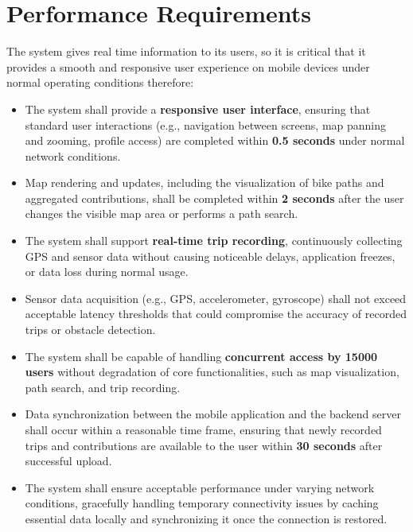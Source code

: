\section{Performance Requirements}

The system gives real time information to its users, so it is critical that it provides a smooth and responsive user experience on mobile devices under normal operating conditions therefore:

\begin{itemize}
    \item The system shall provide a \textbf{responsive user interface}, ensuring that standard user interactions (e.g., navigation between screens, map panning and zooming, profile access) are completed within \textbf{0.5 seconds} under normal network conditions.
    
    \item Map rendering and updates, including the visualization of bike paths and aggregated contributions, shall be completed within \textbf{2 seconds} after the user changes the visible map area or performs a path search.
    
    \item The system shall support \textbf{real-time trip recording}, continuously collecting GPS and sensor data without causing noticeable delays, application freezes, or data loss during normal usage.
    
    \item Sensor data acquisition (e.g., GPS, accelerometer, gyroscope) shall not exceed acceptable latency thresholds that could compromise the accuracy of recorded trips or obstacle detection.
    
    \item The system shall be capable of handling \textbf{concurrent access by 15000 users} without degradation of core functionalities, such as map visualization, path search, and trip recording.
    
    \item Data synchronization between the mobile application and the backend server shall occur within a reasonable time frame, ensuring that newly recorded trips and contributions are available to the user within \textbf{30 seconds} after successful upload.
    
    \item The system shall ensure acceptable performance under varying network conditions, gracefully handling temporary connectivity issues by caching essential data locally and synchronizing it once the connection is restored.
\end{itemize}

